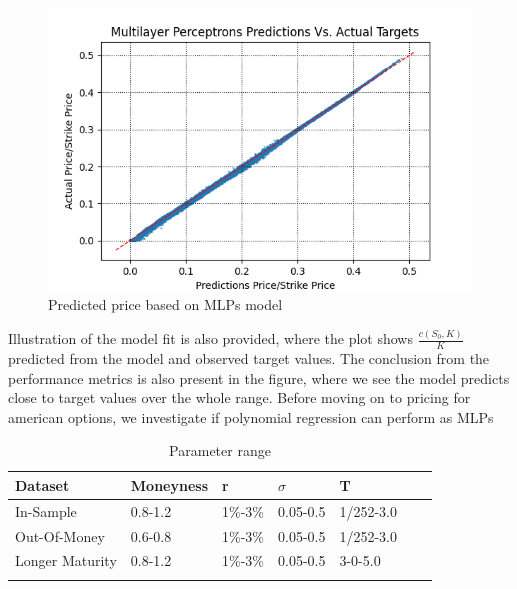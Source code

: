 \begin{figure}[th]
\centering
\includegraphics{Figures/PredictionEuroC.png}
\decoRule
\caption[MLPs Predictions Vs. Actual Prices]{Predicted price based on MLPs model}
\label{fig:MLPsEuroC}
\end{figure}

Illustration of the model fit is also provided, where the plot shows $\frac{c(S_0,K)}{K}$ predicted from the model and observed target values. The conclusion from the performance metrics is also present in the figure, where we see the model predicts close to target values over the whole range. Before moving on to pricing for american options, we investigate if polynomial regression can perform as MLPs

\begin{table}[H]
\caption{Parameter range}
\label{tab:totalEuroParRange}
\centering
\begin{tabular}{l l l l l l l }
\toprule
\textbf{Dataset} & \textbf{Moneyness} & \textbf{r} & \textbf{$\sigma$} & \textbf{T} \\
\midrule
In-Sample & 0.8-1.2 & 1\%-3\% & 0.05-0.5 & 1/252-3.0\\ 
Out-Of-Money & 0.6-0.8 & 1\%-3\% & 0.05-0.5 & 1/252-3.0\\ 
Longer Maturity & 0.8-1.2 & 1\%-3\% & 0.05-0.5 & 3-0-5.0\\ 
\bottomrule\\
\end{tabular}
\end{table}

